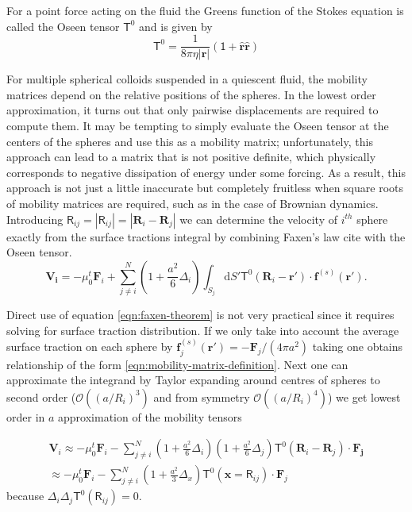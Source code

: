 \documentclass{doctoral}
\newcommand{\dd}{\mathrm{d}}
\newcommand{\mm}[1]{\bm{\mathsf{#1}}} %
\begin{document}
For a point force acting on the fluid the Greens function of the Stokes equation is called the Oseen tensor $\mm{T}^0$ and is given by
\begin{equation}
    \mm{T}^{0} = \frac{1}{8\pi\eta |\bm{r}|} \left( \mm{1} + \bm{\hat{r}}\bm{\hat{r}}\right)
\end{equation}

For multiple spherical colloids suspended in a quiescent fluid, the mobility matrices depend on the relative positions of the spheres.
In the lowest order approximation, it turns out that only pairwise displacements are required to compute them.
It may be tempting to simply evaluate the Oseen tensor at the centers of the spheres and use this as a mobility matrix; unfortunately, this approach can lead to a matrix that is not positive definite, which physically corresponds to negative dissipation of energy under some forcing.
As a result, this approach is not just a little inaccurate but completely fruitless when square roots of mobility matrices are required, such as in the case of Brownian dynamics.
Introducing $\mm{R}_{ij} = |\mm{R}_{ij}| = |\bm{R}_i - \bm{R}_j|$ we can determine the velocity of $i^{th}$ sphere exactly from the surface tractions integral by combining Faxen's law\cite{Faxen_1922} cite with the Oseen tensor.
\begin{equation}
    \bm{V_i} =
    -\mu_0^t \bm{F}_i
    + \sum_{j\neq i}^N
    (1 + \frac{a^2}{6} \Delta_i)
    \int_{S_j} \dd S' \mm{T}^0(\bm{R}_i-\bm{r'})\cdot \bm{f}^{(s)}(\bm{r'}).
    \label{eqn:faxen-theorem}
\end{equation}

Direct use of equation \eqref{eqn:faxen-theorem} is not very practical since it requires solving for surface traction distribution.
If we only take into account the average surface traction on each sphere  by $\bm{f}_j^{(s)}(\bm{r'}) = -\bm{F}_j / (4\pi a^2)$ taking one obtains relationship of the form \eqref{eqn:mobility-matrix-definition}.
Next one can approximate the integrand by Taylor expanding around centres of spheres to second order ($\mathcal{O}((a/R_i)^3)$ and from symmetry $\mathcal{O}((a/R_i)^4)$) we get lowest order in $a$ approximation of the mobility tensors 

\begin{eqnarray}
    \bm{V}_i \approx -\mu_0^t \bm{F}_i  - \sum_{j\neq i}^N (1 + \frac{a^2}{6} \Delta_i) (1 + \frac{a^2}{6} \Delta_j) \mm{T}^{0} (\bm{R}_i - \bm{R}_j) \cdot \bm{F_j} \\
    \approx -\mu_0^t \bm{F}_i  - \sum_{j\neq i}^N (1 + \frac{a^2}{3} \Delta_x) \mm{T}^{0} (\bm{x} = \mm{R}_{ij}) \cdot \bm{F}_j \label{eqn:rotne-prager-derivation}
\end{eqnarray}
because $\Delta_i \Delta_j \mm{T}^0(\mm{R}_{ij}) = 0$.
\end{document}
